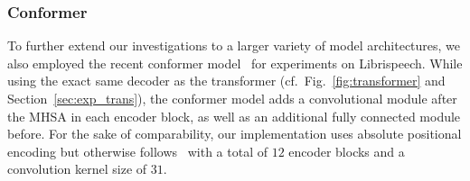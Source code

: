 \documentclass{article}
\begin{document}
\subsubsection{Conformer}\vspace{-2.5mm}
To further extend our investigations to a larger variety of model architectures, we also employed the recent conformer model~\cite{Gulati2020} for experiments on Librispeech. While using the exact same decoder as the transformer (cf.\ Fig.~\ref{fig:transformer} and Section~\ref{sec:exp_trans}), the conformer model adds a convolutional module after the MHSA in each encoder block, as well as an additional fully connected module before. For the sake of comparability, our implementation uses absolute positional encoding but otherwise follows~\cite{Guo2021} with a total of $12$ encoder blocks and a convolution kernel size of $31$.  
 
\end{document}

